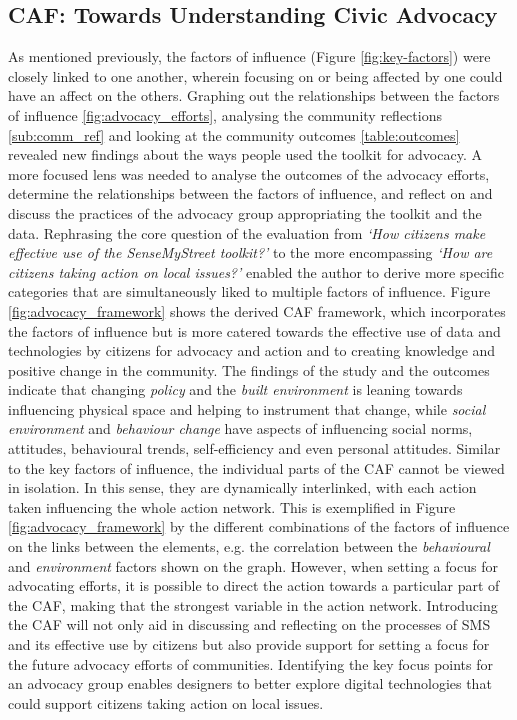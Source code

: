 \subsection[Citizen Advocacy Framework]{CAF: Towards Understanding Civic Advocacy}
As mentioned previously, the factors of influence (Figure \ref{fig:key-factors}) were closely linked to one another, wherein focusing on or being affected by one could have an affect on the others. Graphing out the relationships between the factors of influence \ref{fig:advocacy_efforts}, analysing the community reflections \ref{sub:comm_ref} and looking at the community outcomes \ref{table:outcomes} revealed new findings about the ways people used the toolkit for advocacy. A more focused lens was needed to analyse the outcomes of the advocacy efforts, determine the relationships between the factors of influence, and reflect on and discuss the practices of the advocacy group appropriating the toolkit and the data. Rephrasing the core question of the evaluation from \textit{`How citizens make effective use of the SenseMyStreet toolkit?'} to the more encompassing \textit{`How are citizens taking action on local issues?'} enabled the author to derive more specific categories that are simultaneously liked to multiple factors of influence. Figure \ref{fig:advocacy_framework} shows the derived CAF framework, which incorporates the factors of influence but is more catered towards the effective use of data and technologies by citizens for advocacy and action and to creating knowledge and positive change in the community. The findings of the study and the outcomes indicate that changing \textit{policy} and the \textit{built environment} is leaning towards influencing physical space and helping to instrument that change, while \textit{social environment} and \textit{behaviour change} have aspects of influencing social norms, attitudes, behavioural trends, self-efficiency and even personal attitudes. Similar to the key factors of influence, the individual parts of the CAF cannot be viewed in isolation. In this sense, they are dynamically interlinked, with each action taken influencing the whole action network. This is exemplified in Figure \ref{fig:advocacy_framework} by the different combinations of the factors of influence on the links between the elements, e.g. the correlation between the \textit{behavioural} and \textit{environment} factors shown on the graph. However, when setting a focus for advocating efforts, it is possible to direct the action towards a particular part of the CAF, making that the strongest variable in the action network. Introducing the CAF will not only aid in discussing and reflecting on the processes of SMS and its effective use by citizens but also provide support for setting a focus for the future advocacy efforts of communities. Identifying the key focus points for an advocacy group enables designers to better explore digital technologies that could support citizens taking action on local issues.

